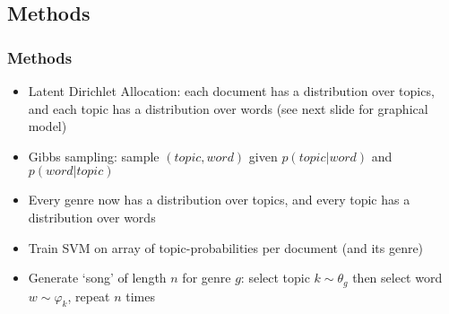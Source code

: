 \documentclass[t,ignorenonframetext]{beamer}
\begin{document}
\subsection{Methods}
\begin{frame}

\frametitle{Methods}
\begin{itemize}
	\item Latent Dirichlet Allocation: each document has a distribution over topics, and each topic has a distribution over words (see next slide for graphical model)
	\item Gibbs sampling: sample $(topic,word)$ given $p(topic|word)$ and $p(word|topic)$
	\item Every genre now has a distribution over topics, and every topic has a distribution over words
	\item Train SVM on array of topic-probabilities per document (and its genre)
	\item Generate `song' of length $n$ for genre $g$: select topic $k \sim \theta_g$ then select word $w \sim \varphi_k$, repeat $n$ times
\end{itemize}

\end{frame}
\end{document}
